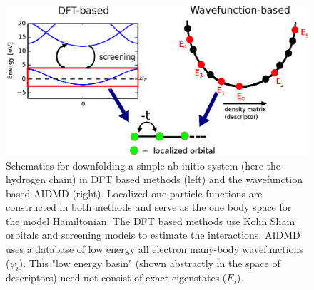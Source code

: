 \begin{figure}
\centering
\includegraphics[width=1\linewidth]{./Figures/figure1.eps}
\caption{Schematics for downfolding a simple ab-initio system (here the hydrogen chain) in DFT based methods (left) and the wavefunction based AIDMD (right). 
Localized one particle functions are constructed in both methods and serve as the one body space for the model Hamiltonian. 
The DFT based methods use Kohn Sham orbitals and screening models to estimate the interactions. 
AIDMD uses a database of low energy all electron many-body wavefunctions ($\psi_i$). 
This "low energy basin" (shown abstractly in the space of descriptors) need not consist of exact eigenstates ($E_i$).}
\label{fig:lowenergybasin_schematic}
\end{figure}	



